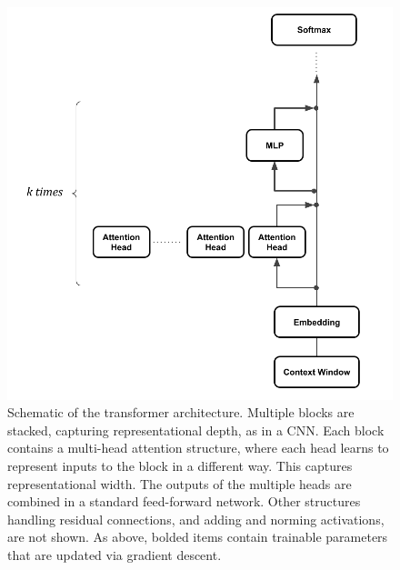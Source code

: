 \begin{figure}[h]
\centering
\includegraphics[scale=.35]{./images/transformerBlockMultiHeadResidualStream.png}
\caption[Jeff Yoshimi with consultation from Tim Meyer.]{Schematic of the transformer architecture. Multiple blocks are stacked, capturing representational depth, as in a CNN. Each block contains a multi-head attention structure, where each head learns to represent inputs to the block in a different way. This captures representational width. The outputs of the multiple heads are combined in a standard feed-forward network. Other structures handling residual connections, and adding and norming activations, are not shown. As above, bolded items contain trainable parameters that are updated via gradient descent.}
\label{multipleHeads}
\end{figure}
 
